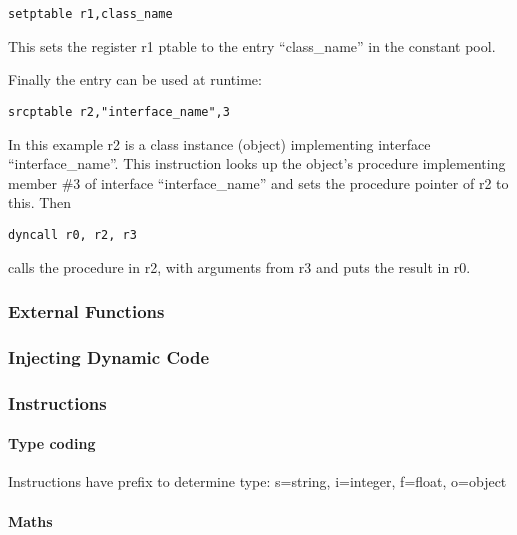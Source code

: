 \begin{verbatim}
setptable r1,class_name
\end{verbatim}

This sets the register r1 ptable to the entry ``class\_name'' in the
constant pool.

Finally the entry can be used at runtime:

\begin{verbatim}
srcptable r2,"interface_name",3
\end{verbatim}

In this example r2 is a class instance (object) implementing interface
``interface\_name''. This instruction looks up the object's procedure
implementing member \#3 of interface ``interface\_name'' and sets the
procedure pointer of r2 to this. Then

\begin{verbatim}
dyncall r0, r2, r3
\end{verbatim}

calls the procedure in r2, with arguments from r3 and puts the result in
r0.

\hypertarget{external-functions}{%
\subsubsection{External Functions}\label{external-functions}}

\hypertarget{injecting-dynamic-code}{%
\subsubsection{Injecting Dynamic Code}\label{injecting-dynamic-code}}

\hypertarget{instructions-1}{%
\subsubsection{Instructions}\label{instructions-1}}

\hypertarget{type-coding}{%
\paragraph{Type coding}\label{type-coding}}

Instructions have prefix to determine type: s=string, i=integer,
f=float, o=object

\hypertarget{maths}{%
\paragraph{Maths}\label{maths}}


